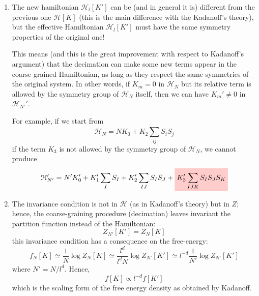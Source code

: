 \documentclass[../main/main.tex]{subfiles}
\begin{document}
\begin{enumerate}
\item The new hamiltonian \( \mathcal{H}_l [K'] \) can be (and in general it is) different from the previous one \( \mathcal{H} [K] \) (this is the main difference with the Kadanoff's theory), but the effective Hamiltonian \(  \mathcal{H}_l [K']\)  must have the same symmetry properties of the original one!

This means (and this is the great improvement with respect to Kadanoff's argument) that the decimation can make some new terms appear in the coarse-grained Hamiltonian, as long as they respect the same symmetries of the original system. In other words, if \( K_m=0 \)  in \( \mathcal{H}_N \)  but its relative term is allowed by the symmetry group of \( \mathcal{H}_N \)  itself, then we can have \( K_m' \neq 0 \) in \( \mathcal{H}_{N'}' \).

For example, if we start from
\begin{equation*}
  \mathcal{H}_N = N K_0 + K_2 \sum_{ij}^{} S_i S_j
\end{equation*}
if the term \( K_3 \) is not allowed by the symmetry group of \( \mathcal{H}_N \), we cannot produce
\begin{equation*}
  \mathcal{H}_{N'}' = N' K_0' + K_1' \sum_{I}^{} S_I + K_2' \sum_{IJ}^{} S_I S_J
  + \mathcolorbox{red!20}{ K_3' \sum_{IJK}^{} S_I S_J S_K}
\end{equation*}

\item The invariance condition is not in \( \mathcal{H} \) (as in Kadanoff's theory) but in \( Z \); hence, the coarse-graining procedure (decimation) leaves invariant the partition function instead of the Hamiltonian:
\begin{equation}
  Z_{N'} [K'] = Z_N [K]
  \label{eq:20_2}
\end{equation}
this invariance condition has a consequence on the free-energy:
  \begin{equation*}
  f_N [K]  \simeq \frac{1}{N} \log{Z_N [K]} \simeq \frac{l^d}{l^d N} \log{Z_{N'}[K']} \simeq l^{-d} \frac{1}{N'} \log{Z_{N'}} [K']
\end{equation*}
where \( N' = N/l^d \).
Hence,
\begin{equation}
  f [K] \propto l^{-d} f [K']
\end{equation}
which is the scaling form of the free energy density as obtained by Kadanoff.

\end{enumerate}
\end{document}
